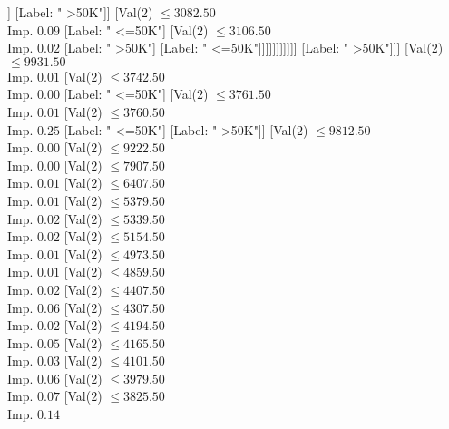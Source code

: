 \documentclass[margin=10pt]{standalone}
\begin{document}
\begin{forest}
																										[Label: " <=50K"]]
																									[Label: " >50K"]]
																								[Val($2$) $ \leq 3082.50$ \\ Imp. $0.09$
																									[Label: " <=50K"]
																									[Val($2$) $ \leq 3106.50$ \\ Imp. $0.02$
																										[Label: " >50K"]
																										[Label: " <=50K"]]]]]]]]]]]
																[Label: " >50K"]]]
														[Val($2$) $ \leq 9931.50$ \\ Imp. $0.01$
															[Val($2$) $ \leq 3742.50$ \\ Imp. $0.00$
																[Label: " <=50K"]
																[Val($2$) $ \leq 3761.50$ \\ Imp. $0.01$
																	[Val($2$) $ \leq 3760.50$ \\ Imp. $0.25$
																		[Label: " <=50K"]
																		[Label: " >50K"]]
																	[Val($2$) $ \leq 9812.50$ \\ Imp. $0.00$
																		[Val($2$) $ \leq 9222.50$ \\ Imp. $0.00$
																			[Val($2$) $ \leq 7907.50$ \\ Imp. $0.01$
																				[Val($2$) $ \leq 6407.50$ \\ Imp. $0.01$
																					[Val($2$) $ \leq 5379.50$ \\ Imp. $0.02$
																						[Val($2$) $ \leq 5339.50$ \\ Imp. $0.02$
																							[Val($2$) $ \leq 5154.50$ \\ Imp. $0.01$
																								[Val($2$) $ \leq 4973.50$ \\ Imp. $0.01$
																									[Val($2$) $ \leq 4859.50$ \\ Imp. $0.02$
																										[Val($2$) $ \leq 4407.50$ \\ Imp. $0.06$
																											[Val($2$) $ \leq 4307.50$ \\ Imp. $0.02$
																												[Val($2$) $ \leq 4194.50$ \\ Imp. $0.05$
																													[Val($2$) $ \leq 4165.50$ \\ Imp. $0.03$
																														[Val($2$) $ \leq 4101.50$ \\ Imp. $0.06$
																															[Val($2$) $ \leq 3979.50$ \\ Imp. $0.07$
																																[Val($2$) $ \leq 3825.50$ \\ Imp. $0.14$

\end{forest}
\end{document}

